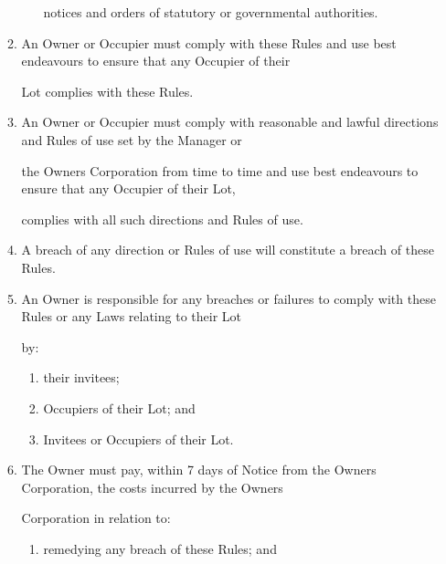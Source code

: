 \documentclass{article}
\begin{document}
\begin{enumerate}[label=\arabic*.]
\begin{enumerate}[label=\arabic{enumi}.\arabic*.]
\begin{enumerate}[label=(\arabic*)]
{\fontsize{10.02}{1}notices and orders of statutory or governmental authorities. }

\end{enumerate}
\item {\fontsize{9.99}{1} An Owner or Occupier must comply with these Rules and use best endeavours to ensure that any Occupier of their }

{\fontsize{10.02}{1}Lot complies with these Rules. }

\item {\fontsize{9.99}{1} An Owner or Occupier must comply with reasonable and lawful directions and Rules of use set by the Manager or }

{\fontsize{10.02}{1}the Owners Corporation from time to time and use best endeavours to ensure that any Occupier of their Lot, }

{\fontsize{10.02}{1}complies with all such directions and Rules of use. }

\newpage

\item {\fontsize{9.99}{1} A breach of any direction or Rules of use will constitute a breach of these Rules. }

\item {\fontsize{9.99}{1} An Owner is responsible for any breaches or failures to comply with these Rules or any Laws relating to their Lot }

{\fontsize{10.02}{1}by: }

\begin{enumerate}[label=(\arabic*)]
\item {\fontsize{9.962}{1} their invitees; }

\item {\fontsize{9.962}{1} Occupiers of their Lot; and }

\item {\fontsize{9.962}{1} Invitees or Occupiers of their Lot. }

\end{enumerate}
\item {\fontsize{9.99}{1} The Owner must pay, within 7 days of Notice from the Owners Corporation, the costs incurred by the Owners }

{\fontsize{10.02}{1}Corporation in relation to: }

\begin{enumerate}[label=(\arabic*)]
\item {\fontsize{9.962}{1} remedying any breach of these Rules; and }


\end{enumerate}
\end{enumerate}
\end{enumerate}
\end{document}
